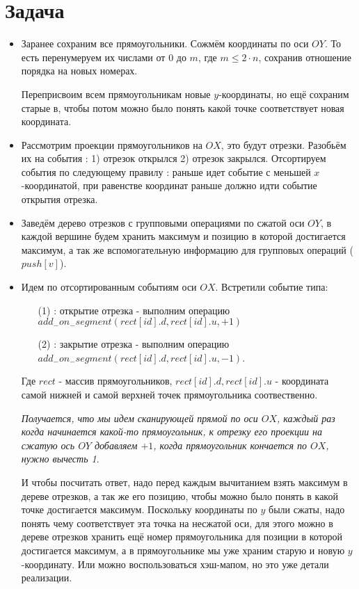 \documentclass{article}
\begin{document}
\section*{Задача }
\begin{itemize}
\item Заранее сохраним все прямоугольники. Сожмём координаты по оси $OY$. То есть перенумеруем их числами от $0$ до $m$, где $m \leq 2 \cdot n$, сохранив отношение порядка на новых номерах.

Переприсвоим всем прямоугольникам новые $y$-координаты, но ещё сохраним старые в, чтобы потом можно было понять какой точке соответствует новая координата.
\item Рассмотрим проекции прямоугольников на $OX$, это будут отрезки. Разобьём их на события : 1) отрезок открылся 2) отрезок закрылся. 
Отсортируем события по следующему правилу : раньше идет событие с меньшей $x$-координатой, при равенстве координат раньше должно идти событие открытия отрезка.
\item Заведём дерево отрезков с групповыми операциями по сжатой оси $OY$, в каждой вершине будем хранить максимум и позицию в которой достигается максимум, а так же вспомогательную информацию для групповых операций ($push[v]$).
\item Идем по отсортированным событиям оси $OX$.
Встретили событие типа: \begin{itemize}
\item [(1)] : открытие отрезка - выполним операцию $add_-on_-segment(rect[id].d, rect[id].u, +1)$
\item [(2)] : закрытие отрезка - выполним операцию $add_-on_-segment(rect[id].d, rect[id].u, -1)$.
\end{itemize} 

Где $rect$ - массив прямоугольников, $rect[id].d, rect[id].u$ - координата самой нижней и самой верхней точек прямоугольника соотвественно.

\textsl{Получается, что мы идем сканирующей прямой по оси $OX$, каждый раз когда начинается какой-то прямоугольник, к отрезку его проекции на сжатую ось $OY$ добавляем $+1$, когда прямоугольник кончается по $OX$, нужно вычесть 1}.

И чтобы посчитать ответ, надо перед каждым вычитанием взять максимум в дереве отрезков, а так же его позицию, чтобы можно было понять в какой точке достигается максимум. Поскольку координаты по $y$ были сжаты, надо понять чему соответствует эта точка на несжатой оси, для этого можно в дереве отрезков хранить ещё номер прямоугольника для позиции в которой достигается максимум, а в прямоугольнике мы уже храним старую и новую $y$-координату. Или можно воспользоваться хэш-мапом, но это уже детали реализации.
\end{itemize}
\end{document}
